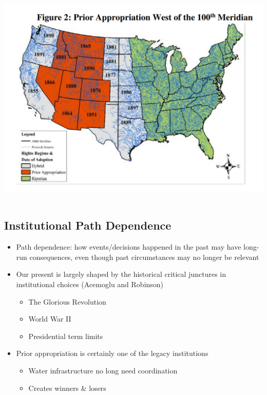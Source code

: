 \documentclass[]{article}
\providecommand{\tightlist}{%
  \setlength{\itemsep}{0pt}\setlength{\parskip}{0pt}}
\begin{document}
\hypertarget{section-37}{%
\subsection{}\label{section-37}}

\includegraphics[width=\textwidth,height=4.16667in]{figures/m10_prior_appropriation_development.png}

\hypertarget{institutional-path-dependence}{%
\subsection{Institutional Path
Dependence}\label{institutional-path-dependence}}

\begin{itemize}
\tightlist
\item
  Path dependence: how events/decisions happened in the past may have
  long-run consequences, even though past circumstances may no longer be
  relevant
\item
  Our present is largely shaped by the historical critical junctures in
  institutional choices (Acemoglu and Robinson)

  \begin{itemize}
  \tightlist
  \item
    The Glorious Revolution
  \item
    World War II
  \item
    Presidential term limits
  \end{itemize}
\item
  Prior appropriation is certainly one of the legacy institutions

  \begin{itemize}
  \tightlist
  \item
    Water infrastructure no long need coordination
  \item
    Creates winners \& losers
  \end{itemize}
\end{itemize}
\end{document}
